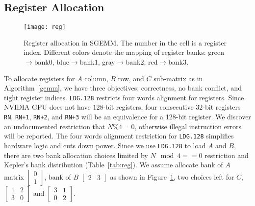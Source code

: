 \subsection{Register Allocation}
\label{sec:register}
\begin{figure}[htbp]
\begin{center}
\texttt{[image: reg]}
\caption{Register allocation in SGEMM. The number in the cell is a register index.
Different colors denote the mapping of register banks: green$\rightarrow$bank0,
    blue$\rightarrow$bank1, gray$\rightarrow$bank2, red$\rightarrow$bank3.}
\label{fig:reg}
\end{center}
\end{figure}

To allocate registers for $A$ column, $B$ row, and $C$ sub-matrix as in Algorithm~\ref{gemm}, we have three objectives:
correctness, no bank conflict, and tight register indices.
{\tt LDG.128} restricts four words alignment for registers.
Since NVIDIA GPU does not have $128$-bit registers, 
four consecutive $32$-bit registers {\tt RN}, {\tt RN+1}, {\tt RN+2}, and {\tt RN+3} will be an equivalence for a 128-bit
register.
We discover an undocumented restriction that $N\%4=0$, otherwise illegal instruction errors will be reported.
The four words alignment restriction for {\tt LDG.128} simplifies hardware logic and cuts down power.
Since we use {\tt LDG.128} to load $A$ and $B$, there are two bank allocation choices limited by $N\mod4==0$ restriction and Kepler's bank distribution (Table~\ref{tab:reg}).
We assume allocate bank of $A$ matrix $\begin{bmatrix} 0 \\ 1  \end{bmatrix}$,
   bank of $B$ $\begin{bmatrix} 2 & 3 \end{bmatrix}$ as shown in Figure~\ref{fig:reg}, two choices left for $C$,
$\begin{bmatrix} 1 & 2 \\ 3 & 0  \end{bmatrix}$ and
$\begin{bmatrix} 3 & 1 \\ 0 & 2  \end{bmatrix}$.
